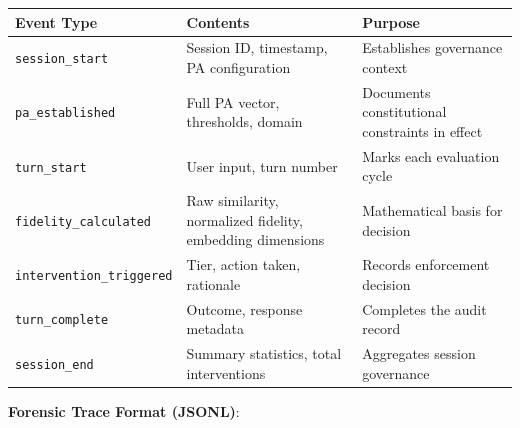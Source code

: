 {\def\LTcaptype{none} %
\begin{longtable}[]{@{}
  >{\raggedright\arraybackslash}p{}
  >{\raggedright\arraybackslash}p{}
  >{\raggedright\arraybackslash}p{}@{}}
\toprule\noalign{}
\begin{minipage}[b]{\linewidth}\raggedright
Event Type
\end{minipage} & \begin{minipage}[b]{\linewidth}\raggedright
Contents
\end{minipage} & \begin{minipage}[b]{\linewidth}\raggedright
Purpose
\end{minipage} \\
\midrule\noalign{}
\endhead
\bottomrule\noalign{}
\endlastfoot
\texttt{session\_start} & Session ID, timestamp, PA configuration &
Establishes governance context \\
\texttt{pa\_established} & Full PA vector, thresholds, domain &
Documents constitutional constraints in effect \\
\texttt{turn\_start} & User input, turn number & Marks each evaluation
cycle \\
\texttt{fidelity\_calculated} & Raw similarity, normalized fidelity,
embedding dimensions & Mathematical basis for decision \\
\texttt{intervention\_triggered} & Tier, action taken, rationale &
Records enforcement decision \\
\texttt{turn\_complete} & Outcome, response metadata & Completes the
audit record \\
\texttt{session\_end} & Summary statistics, total interventions &
Aggregates session governance \\
\end{longtable}
}

\textbf{Forensic Trace Format (JSONL)}:

\begin{Shaded}
\begin{Highlighting}[]
\FunctionTok{\{}
  \FunctionTok{:} \FunctionTok{,}
  \FunctionTok{:} \FunctionTok{,}
  \FunctionTok{:} \FunctionTok{,}
  \FunctionTok{:} \FunctionTok{,}
  \FunctionTok{:} \FunctionTok{,}
  \FunctionTok{:} \FunctionTok{,}
  \FunctionTok{:} \FunctionTok{,}
  \FunctionTok{:} \FunctionTok{,}
  \FunctionTok{:} \FunctionTok{,}
  \FunctionTok{:} \FunctionTok{,}
  \FunctionTok{:} 
\FunctionTok{\}}
\end{Highlighting}
\end{Shaded}

